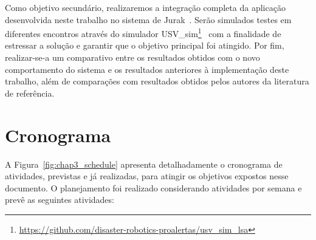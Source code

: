         Como objetivo secundário, realizaremos a integração completa da aplicação desenvolvida neste trabalho no sistema de Jurak~\cite{JURAK2020}. Serão simulados testes em diferentes encontros através do simulador USV\_sim\footnote{\url{https://github.com/disaster-robotics-proalertas/usv\_sim\_lsa}}~\cite{Paravisi2018Toward} com a finalidade de estressar a solução e garantir que o objetivo principal foi atingido. Por fim, realizar-se-a um comparativo entre os resultados obtidos com o novo comportamento do sistema e os resultados anteriores à implementação deste trabalho, além de comparações com resultados obtidos pelos autores da literatura de referência.
        
    \section{Cronograma}
        A Figura~\ref{fig:chap3_schedule} apresenta detalhadamente o cronograma de atividades, previstas e já realizadas, para atingir os objetivos expostos nesse documento. O planejamento foi realizado considerando atividades por semana e prevê as seguintes atividades:
